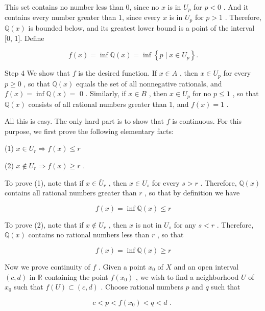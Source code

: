 \documentclass[10pt]{article}
\begin{document}
This set contains no number less than 0, since no \(x\) is in \({U}_{p}\) for \(p < 0\) . And it contains every number greater than 1, since every \(x\) is in \({U}_{p}\) for \(p > 1\) . Therefore, \(\mathbb{Q}\left( x\right)\) is bounded below, and its greatest lower bound is a point of the interval [0, 1]. Define

\[
f\left( x\right)  = \inf \mathbb{Q}\left( x\right)  = \inf \left\{  {p \mid  x \in  {U}_{p}}\right\}  .
\]

Step 4 We show that \(f\) is the desired function. If \(x \in  A\) , then \(x \in  {U}_{p}\) for every \(p \geq  0\) , so that \(\mathbb{Q}\left( x\right)\) equals the set of all nonnegative rationals, and \(f\left( x\right)  = \inf \mathbb{Q}\left( x\right)  =\) 0 . Similarly, if \(x \in  B\) , then \(x \in  {U}_{p}\) for no \(p \leq  1\) , so that \(\mathbb{Q}\left( x\right)\) consists of all rational numbers greater than 1, and \(f\left( x\right)  = 1\) .

All this is easy. The only hard part is to show that \(f\) is continuous. For this purpose, we first prove the following elementary facts:

(1) \(x \in  {\bar{U}}_{r} \Rightarrow  f\left( x\right)  \leq  r\)

(2) \(x \notin  {U}_{r} \Rightarrow  f\left( x\right)  \geq  r\) .

To prove (1), note that if \(x \in  {\bar{U}}_{r}\) , then \(x \in  {U}_{s}\) for every \(s > r\) . Therefore, \(\mathbb{Q}\left( x\right)\) contains all rational numbers greater than \(r\) , so that by definition we have

\[
f\left( x\right)  = \inf \mathbb{Q}\left( x\right)  \leq  r
\]

To prove (2), note that if \(x \notin  {U}_{r}\) , then \(x\) is not in \({U}_{s}\) for any \(s < r\) . Therefore, \(\mathbb{Q}\left( x\right)\) contains no rational numbers less than \(r\) , so that

\[
f\left( x\right)  = \inf \mathbb{Q}\left( x\right)  \geq  r
\]

Now we prove continuity of \(f\) . Given a point \({x}_{0}\) of \(X\) and an open interval \(\left( {c,d}\right)\) in \(\mathbb{R}\) containing the point \(f\left( {x}_{0}\right)\) , we wish to find a neighborhood \(U\) of \({x}_{0}\) such that \(f\left( U\right)  \subset  \left( {c,d}\right)\) . Choose rational numbers \(p\) and \(q\) such that

\[
c < p < f\left( {x}_{0}\right)  < q < d\text{ . }
\]
\end{document}
